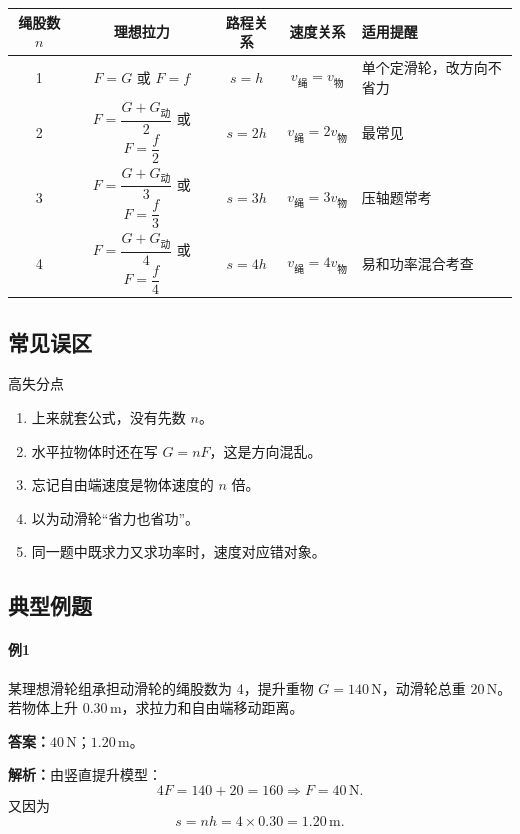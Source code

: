 \documentclass[12pt,a4paper]{ctexart}
\newcommand{\Ans}[1]{\par\noindent\textbf{答案：}#1\par}
\newcommand{\Sol}[1]{\par\noindent\textbf{解析：}#1\par}
\begin{document}
\begin{center}
\small
\begin{tabularx}{\textwidth}{c c c c X}
\toprule
绳股数 $n$ & 理想拉力 & 路程关系 & 速度关系 & 适用提醒\\
\midrule
1 & $F=G$ 或 $F=f$ & $s=h$ & $v_{\text{绳}}=v_{\text{物}}$ & 单个定滑轮，改方向不省力\\
2 & $F=\dfrac{G+G_{\text{动}}}{2}$ 或 $F=\dfrac{f}{2}$ & $s=2h$ & $v_{\text{绳}}=2v_{\text{物}}$ & 最常见\\
3 & $F=\dfrac{G+G_{\text{动}}}{3}$ 或 $F=\dfrac{f}{3}$ & $s=3h$ & $v_{\text{绳}}=3v_{\text{物}}$ & 压轴题常考\\
4 & $F=\dfrac{G+G_{\text{动}}}{4}$ 或 $F=\dfrac{f}{4}$ & $s=4h$ & $v_{\text{绳}}=4v_{\text{物}}$ & 易和功率混合考查\\
\bottomrule
\end{tabularx}
\end{center}

\subsection{常见误区}
\begin{pitfallbox}{高失分点}
\begin{enumerate}[label=\arabic*.]
\item 上来就套公式，没有先数 $n$。
\item 水平拉物体时还在写 $G=nF$，这是方向混乱。
\item 忘记自由端速度是物体速度的 $n$ 倍。
\item 以为动滑轮“省力也省功”。
\item 同一题中既求力又求功率时，速度对应错对象。
\end{enumerate}
\end{pitfallbox}

\subsection{典型例题}
\paragraph{例1}
某理想滑轮组承担动滑轮的绳股数为 4，提升重物 $G=140\,\mathrm{N}$，动滑轮总重
$20\,\mathrm{N}$。若物体上升 $0.30\,\mathrm{m}$，求拉力和自由端移动距离。

\Ans{$40\,\mathrm{N}$；$1.20\,\mathrm{m}$。}
\Sol{由竖直提升模型：
\[
4F=140+20=160 \Rightarrow F=40\,\mathrm{N}.
\]
又因为
\[
s=nh=4\times 0.30=1.20\,\mathrm{m}.
\]}
\end{document}

